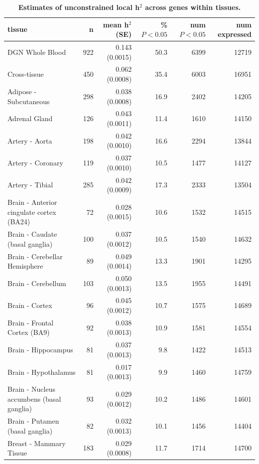 \documentclass[10pt,letterpaper]{article}
\begin{document}
\begin{table}[!ht]
\begin{adjustwidth}{-2.25in}{0in} %
\caption{
{\bf Estimates of unconstrained local h$^2$ across genes within tissues.}}
\begin{tabular}{lrrrrr}
  \hline
tissue & n & mean h$^2$ (SE) & \% $P<0.05$ & num $P<0.05$ & num expressed \\ 
  \hline
DGN Whole Blood & 922 & 0.143 (0.0015) & 50.3 & 6399 & 12719 \\ 
  Cross-tissue & 450 & 0.062 (0.0008) & 35.4 & 6003 & 16951 \\ 
  Adipose - Subcutaneous & 298 & 0.038 (0.0008) & 16.9 & 2402 & 14205 \\ 
  Adrenal Gland & 126 & 0.043 (0.0011) & 11.4 & 1610 & 14150 \\ 
  Artery - Aorta & 198 & 0.042 (0.0010) & 16.6 & 2294 & 13844 \\ 
  Artery - Coronary & 119 & 0.037 (0.0010) & 10.5 & 1477 & 14127 \\ 
  Artery - Tibial & 285 & 0.042 (0.0009) & 17.3 & 2333 & 13504 \\ 
  Brain - Anterior cingulate cortex (BA24) & 72 & 0.028 (0.0015) & 10.6 & 1532 & 14515 \\ 
  Brain - Caudate (basal ganglia) & 100 & 0.037 (0.0012) & 10.5 & 1540 & 14632 \\ 
  Brain - Cerebellar Hemisphere & 89 & 0.049 (0.0014) & 13.3 & 1901 & 14295 \\ 
  Brain - Cerebellum & 103 & 0.050 (0.0013) & 13.5 & 1955 & 14491 \\ 
  Brain - Cortex & 96 & 0.045 (0.0012) & 10.7 & 1575 & 14689 \\ 
  Brain - Frontal Cortex (BA9) & 92 & 0.038 (0.0013) & 10.9 & 1581 & 14554 \\ 
  Brain - Hippocampus & 81 & 0.037 (0.0013) & 9.8 & 1422 & 14513 \\ 
  Brain - Hypothalamus & 81 & 0.017 (0.0013) & 9.9 & 1460 & 14759 \\ 
  Brain - Nucleus accumbens (basal ganglia) & 93 & 0.029 (0.0012) & 10.2 & 1486 & 14601 \\ 
  Brain - Putamen (basal ganglia) & 82 & 0.032 (0.0013) & 10.1 & 1456 & 14404 \\ 
  Breast - Mammary Tissue & 183 & 0.029 (0.0008) & 11.7 & 1714 & 14700 \\ 

\end{tabular}
\end{adjustwidth}
\end{table}
\end{document}
